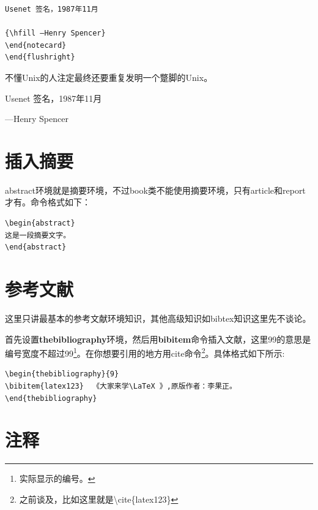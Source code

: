 \documentclass[12pt,oneside]{book}
\begin{document}
\begin{common-format}
\begin{Verbatim}
Usenet 签名，1987年11月

{\hfill —Henry Spencer}
\end{notecard}
\end{flushright}
\end{Verbatim}

\begin{flushright}
\begin{notecard}[blue!30]{14em}
不懂Unix的人注定最终还要重复发明一个蹩脚的Unix。

Usenet 签名，1987年11月

{\hfill —Henry Spencer}
\end{notecard}
\end{flushright}



\section{插入摘要}
abstract环境就是摘要环境，不过book类不能使用摘要环境，只有article和report才有。命令格式如下：
\begin{Verbatim}
\begin{abstract}
这是一段摘要文字。
\end{abstract}
\end{Verbatim}



\section{参考文献}
这里只讲最基本的参考文献环境知识，其他高级知识如bibtex知识这里先不谈论。

首先设置\textbf{thebibliography}环境，然后用\textbf{bibitem}命令插入文献，这里99的意思是编号宽度不超过99\footnote{实际显示的编号。}。在你想要引用的地方用cite命令\footnote{之前谈及，比如这里就是\textbackslash cite\{latex123\}}。具体格式如下所示:

\begin{Verbatim}
\begin{thebibliography}{9}
\bibitem{latex123}  《大家来学\LaTeX 》,原版作者：李果正。
\end{thebibliography}
\end{Verbatim}




\section{注释}
\showendnotes








\end{common-format}
\end{document}
